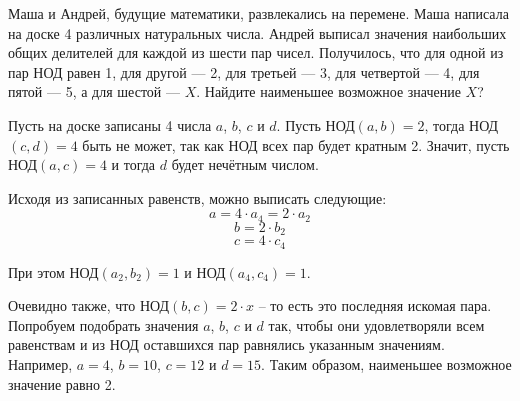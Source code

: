 
Маша и Андрей, будущие математики, развлекались на перемене. 
Маша написала на доске 4  различных натуральных числа. 
Андрей выписал значения наибольших общих делителей для каждой из шести пар чисел. 
Получилось, что для одной из пар НОД  равен 1, для другой — 2, для третьей — 3, для четвертой — 4, 
для пятой — 5, а для шестой — $X$. Найдите наименьшее возможное значение $X$?

\solutionSection

Пусть на доске записаны 4 числа $a$, $b$, $c$ и $d$. Пусть НОД$(a, b) = 2$, тогда НОД$(c, d) = 4$ быть не 
может, так как НОД всех пар будет кратным 2. Значит, пусть НОД$(a, c) = 4$ и тогда $d$ будет нечётным числом.

Исходя из записанных равенств, можно выписать следующие:
$$a = 4\cdot a_4 = 2 \cdot a_2$$
$$b = 2\cdot b_2$$
$$c = 4\cdot c_4$$

При этом НОД$(a_2, b_2) = 1$ и НОД$(a_4, c_4) = 1$. 

Очевидно также, что \linebreak НОД$(b, c) = 2 \cdot x$ -- то есть это последняя искомая пара. Попробуем подобрать значения $a$, $b$, $c$ и $d$ так, чтобы они удовлетворяли всем равенствам и из НОД оставшихся пар равнялись указанным значениям. Например, $a = 4$, $b = 10$, $c = 12$ и $d = 15$. Таким образом, наименьшее возможное значение равно 2.

